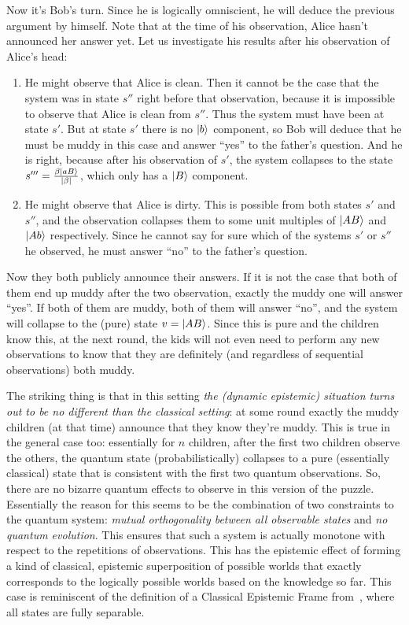 \documentclass[a4paper]{article}
\begin{document}
Now it's Bob's turn. Since he is logically omniscient, he will deduce the
previous argument by himself. Note that at the time of his observation, Alice
hasn't announced her answer yet. Let us investigate his results after his
observation of Alice's head:
\begin{enumerate}
    \item He might observe that Alice is clean. Then it cannot be the case that
        the system was in state $s''$ right before that observation, because it
        is impossible to observe that Alice is clean from $s''$. Thus the system
        must have been at state $s'$. But at state $s'$ there is no $\ket{b}$
        component, so Bob will deduce that he must be muddy in this case and
        answer ``yes'' to the father's question. And
        he is right, because after his observation of $s'$, the system collapses
        to the state $s''' = \frac{\beta\ket{aB}}{|\beta|}$, which only has a
        $\ket{B}$ component.
    \item He might observe that Alice is dirty. This is possible from both
        states $s'$ and $s''$, and the observation collapses them to
        some unit multiples of $\ket{AB}$ and $\ket{Ab}$  respectively. Since he
        cannot say for sure which of the systems $s'$ or $s''$ he observed, he
        must answer ``no'' to the father's question.
\end{enumerate}

Now they both publicly announce their answers. If it is not the case that both
of them end up muddy after the two observation, exactly the muddy one will
answer ``yes''. If both of them are muddy, both of them will answer ``no'', and
the system will collapse to the (pure) state $v = \ket{AB}$. Since this is
pure and the children know this, at the next round, the kids will not even need
to perform any new observations to know that they are definitely (and regardless
of sequential observations) both muddy.

The striking thing is that in this setting \emph{the (dynamic epistemic) 
situation turns out to be no different than the classical setting}: at some
round exactly the muddy children (at that time) announce that they know they're
muddy. This is true in the general case too: essentially for $n$ children, after
the first two children observe the others, the quantum state (probabilistically) 
collapses to a pure (essentially classical) state that is consistent with the
first two quantum observations. So, there are no bizarre quantum effects to
observe in this version of the puzzle. Essentially the reason for this seems to
be the combination of two constraints to the quantum system: \emph{mutual
orthogonality between all observable states} and \emph{no quantum evolution}.
This ensures that such a system is actually monotone with respect to the
repetitions of observations.
This has the epistemic effect of forming a kind of classical, epistemic
superposition of possible worlds that exactly corresponds to the logically
possible worlds based on the knowledge so far. This case is reminiscent of the
definition of a Classical Epistemic Frame from~\cite{corrkn}, where all states
are fully separable.
\end{document}
